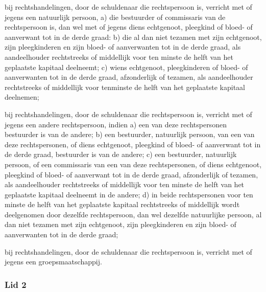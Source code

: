 


bij rechtshandelingen, door de schuldenaar die rechtspersoon is,
verricht met of jegens een natuurlijk persoon, a) die bestuurder of
commissaris van de rechtspersoon is, dan wel met of jegens diens
echtgenoot, pleegkind of bloed- of aanverwant tot in de derde graad: b)
die al dan niet tezamen met zijn echtgenoot, zijn pleegkinderen en zijn
bloed- of aanverwanten tot in de derde graad, als aandeelhouder
rechtstreeks of middellijk voor ten minste de helft van het geplaatste
kapitaal deelneemt; c) wiens echtgenoot, pleegkinderen of bloed- of
aanverwanten tot in de derde graad, afzonderlijk of tezamen, als
aandeelhouder rechtstreeks of middellijk voor tenminste de helft van het
geplaatste kapitaal deelnemen;






bij rechtshandelingen, door de schuldenaar die rechtspersoon is,
verricht met of jegens een andere rechtspersoon, indien a) een van deze
rechtspersonen bestuurder is van de andere; b) een bestuurder,
natuurlijk persoon, van een van deze rechtspersonen, of diens
echtgenoot, pleegkind of bloed- of aanverwant tot in de derde graad,
bestuurder is van de andere; c) een bestuurder, natuurlijk persoon, of
een commissaris van een van deze rechtspersonen, of diens echtgenoot,
pleegkind of bloed- of aanverwant tot in de derde graad, afzonderlijk of
tezamen, als aandeelhouder rechtstreeks of middellijk voor ten minste de
helft van het geplaatste kapitaal deelneemt in de andere; d) in beide
rechtspersonen voor ten minste de helft van het geplaatste kapitaal
rechtstreeks of middellijk wordt deelgenomen door dezelfde
rechtspersoon, dan wel dezelfde natuurlijke persoon, al dan niet tezamen
met zijn echtgenoot, zijn pleegkinderen en zijn bloed- of aanverwanten
tot in de derde graad;






bij rechtshandelingen, door de schuldenaar die rechtspersoon is,
verricht met of jegens een groepsmaatschappij.



\subsubsection{Lid 2}



